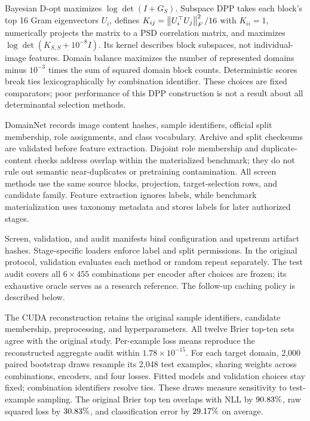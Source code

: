 Bayesian D-opt maximizes $\log\det(I+G_S)$. Subspace DPP takes each block's top 16 Gram eigenvectors $U_i$, defines $K_{ij}=\left\lVert U_i^\top U_j\right\rVert_F^2/16$ with $K_{ii}=1$, numerically projects the matrix to a PSD correlation matrix, and maximizes $\log\det(K_{S,S}+10^{-8}I)$. Its kernel describes block subspaces, not individual-image features. Domain balance maximizes the number of represented domains minus $10^{-3}$ times the sum of squared domain block counts. Deterministic scores break ties lexicographically by combination identifier. These choices are fixed comparators; poor performance of this DPP construction is not a result about all determinantal selection methods.

DomainNet records image content hashes, sample identifiers, official split membership, role assignments, and class vocabulary. Archive and split checksums are validated before feature extraction. Disjoint role membership and duplicate-content checks address overlap within the materialized benchmark; they do not rule out semantic near-duplicates or pretraining contamination. All screen methods use the same source blocks, projection, target-selection rows, and candidate family. Feature extraction ignores labels, while benchmark materialization uses taxonomy metadata and stores labels for later authorized stages.

Screen, validation, and audit manifests bind configuration and upstream artifact hashes. Stage-specific loaders enforce label and split permissions. In the original protocol, validation evaluates each method or random repeat separately. The test audit covers all $6\times455$ combinations per encoder after choices are frozen; its exhaustive oracle serves as a research reference. The follow-up caching policy is described below.

The CUDA reconstruction retains the original sample identifiers, candidate membership, preprocessing, and hyperparameters. All twelve Brier top-ten sets agree with the original study. Per-example loss means reproduce the reconstructed aggregate audit within $1.78\times10^{-15}$. For each target domain, 2,000 paired bootstrap draws resample its 2,048 test examples, sharing weights across combinations, encoders, and four losses. Fitted models and validation choices stay fixed; combination identifiers resolve ties. These draws measure sensitivity to test-example sampling. The original Brier top ten overlaps with NLL by $90.83\%$, raw squared loss by $30.83\%$, and classification error by $29.17\%$ on average.

